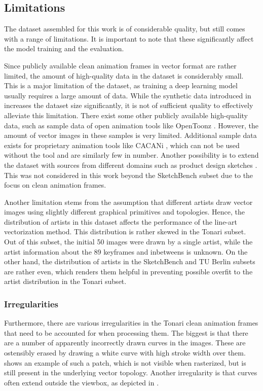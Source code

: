 \subsection{Limitations}
\label{subsec:dataset.limitations}
The dataset assembled for this work is of considerable quality, but still comes with a range of limitations. It is important to note that these significantly affect the model training and the evaluation.

Since publicly available clean animation frames in vector format are rather limited, the amount of high-quality data in the dataset is considerably small. This is a major limitation of the dataset, as training a deep learning model usually requires a large amount of data. While the synthetic data introduced in  increases the dataset size significantly, it is not of sufficient quality to effectively alleviate this limitation. There exist some other publicly available high-quality data, such as sample data of open animation tools like OpenToonz \citep{opentoonz}. However, the amount of vector images in these samples is very limited. Additional sample data exists for proprietary animation tools like CACANi \citep{cacani}, which can not be used without the tool and are similarly few in number. Another possibility is to extend the dataset with sources from different domains such as product design sketches \citep{OpenSketch19}. This was not considered in this work beyond the SketchBench subset due to the focus on clean animation frames.

Another limitation stems from the assumption that different artists draw vector images using slightly different graphical primitives and topologies. Hence, the distribution of artists in this dataset affects the performance of the line-art vectorization method. This distribution is rather skewed in the Tonari subset. Out of this subset, the initial 50 images were drawn by a single artist, while the artist information about the 89 keyframes and inbetweens is unknown. On the other hand, the distribution of artists in the SketchBench and TU Berlin subsets are rather even, which renders them helpful in preventing possible overfit to the artist distribution in the Tonari subset.

\subsubsection{Irregularities}
\label{subsec:dataset.limitations.irregularities}

Furthermore, there are various irregularities in the Tonari clean animation frames that need to be accounted for when processing them. The biggest is that there are a number of apparently incorrectly drawn curves in the images. These are ostensibly erased by drawing a white curve with high stroke width over them.  shows an example of such a patch, which is not visible when rasterized, but is still present in the underlying vector topology. Another irregularity is that curves often extend outside the viewbox, as depicted in .

